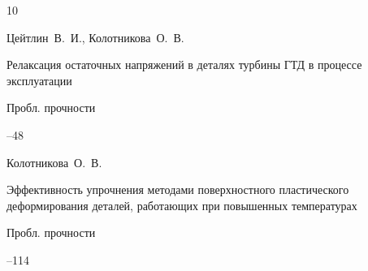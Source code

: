 \begin{thebibliography}{10}






\by Цейтлин~В.~И., Колотникова~О.~В.

\paper Релаксация остаточных напряжений в деталях турбины ГТД в процессе эксплуатации

\jour Пробл. прочности




--48














\by Колотникова~О.~В.

\paper Эффективность упрочнения методами поверхностного пластического деформирования деталей, работающих при повышенных температурах

\jour Пробл. прочности




--114













\end{thebibliography}
